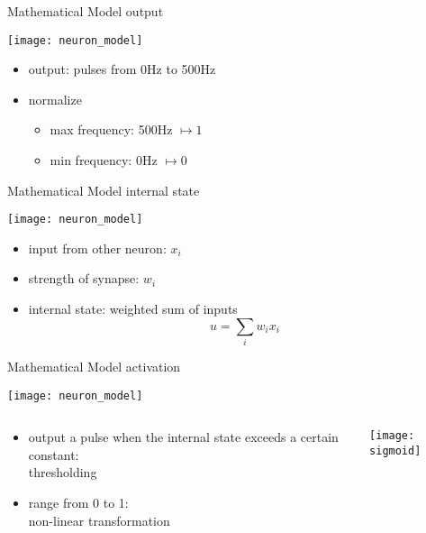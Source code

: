 \documentclass[fleqn,aspectratio=1610]{beamer}
\begin{document}
\begin{frame}[label={sec:org0a63046},t]{Mathematical Model}
output
\begin{center}
\texttt{[image: neuron\_model]}
\end{center}
\begin{itemize}
\item output: pulses from 0Hz to 500Hz
\item normalize
\begin{itemize}
\item max frequency: 500Hz \(\mapsto1\)
\item min frequency: 0Hz \(\mapsto0\)
\end{itemize}
\end{itemize}
\end{frame}

\begin{frame}[label={sec:org50dcb60},t]{Mathematical Model}
internal state
\begin{center}
\texttt{[image: neuron\_model]}
\end{center}
\begin{itemize}
\item input from other neuron: \(x_i\)
\item strength of synapse: \(w_i\)
\item internal state: \alert{weighted sum of inputs}
\begin{equation}
  u=\sum_{i} w_i x_i
\end{equation}
\end{itemize}
\end{frame}

\begin{frame}[label={sec:org287f67b},t]{Mathematical Model}
activation
\begin{center}
\texttt{[image: neuron\_model]}
\end{center}
\begin{columns}
\begin{column}{0.7\columnwidth}
\begin{itemize}
\item output a pulse when the internal state exceeds a certain constant:\\[0pt]
\alert{thresholding}
\item range from 0 to 1:\\[0pt]
\alert{non-linear transformation}
\end{itemize}
\end{column}
\begin{column}{0.3\columnwidth}
\begin{center}
\texttt{[image: sigmoid]}
\end{center}
\end{column}
\end{columns}
\end{frame}
\end{document}
